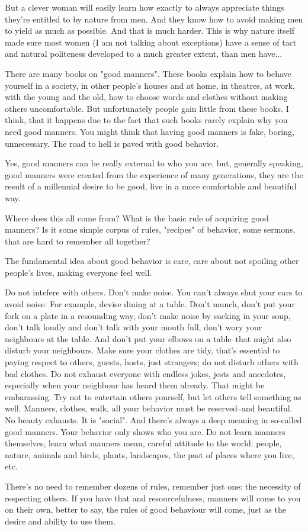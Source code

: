 But a clever woman will easily learn how exactly to always appreciate things they're entitled to by nature from men. And they know how to avoid making men to yield as much as possible. And that is much harder. This is why nature itself made sure most women (I am not talking about exceptions) have a sense of tact and natural politeness developed to a much greater extent, than men have...

There are many books on "good manners". These books explain how to behave yourself in a society, in other people's houses and at home, in theatres, at work, with the young and the old, how to choose words and clothes without making others uncomfortable. But unfortunately people gain little from these books. I think, that it happens due to the fact that such books rarely explain why you need good manners. You might think that having good manners is fake, boring, unnecessary. The road to hell is paved with good behavior.

Yes, good manners can be really external to who you are, but, generally speaking, good manners were created from the experience of many generations, they are the result of a millennial desire to be good, live in a more comfortable and beautiful way.

Where does this all come from? What is the basic rule of acquiring good manners? Is it some simple corpus of rules, "recipes" of behavior, some sermons, that are hard to remember all together?

The fundamental idea about good behavior is care, care about not spoiling other people's lives, making everyone feel well.

Do not intefere with others. Don't make noise. You can't always shut your ears to avoid noise. For example, devise dining at a table. Don't munch, don't put your fork on a plate in a resounding way, don't make noise by sucking in your soup, don't talk loudly and don't talk with your mouth full, don't wory your neighbours at the table. And don't put your elbows on a table--that might also disturb your neighbours. Make sure your clothes are tidy, that's essential to paying respect to others, guests, hosts, just strangers; do not disturb others with bad clothes. Do not exhaust everyone with endless jokes, jests and anecdotes, especially when your neighbour has heard them already. That might be embarassing. Try not to entertain others yourself, but let others tell something as well. Manners, clothes, walk, all your behavior must be reserved--and beautiful.  No beauty exhausts. It is "social". And there's always a deep meaning in so-called good manners. Your behavior only shows who you are. Do not learn manners themselves, learn what manners mean, careful attitude to the world: people, nature, animals and birds, plants, landscapes, the past of places where you live, etc.

There's no need to remember dozens of rules, remember just one: the necessity of respecting others. If you have that and resourcefulness, manners will come to you on their own, better to say, the rules of good behaviour will come, just as the desire and ability to use them.